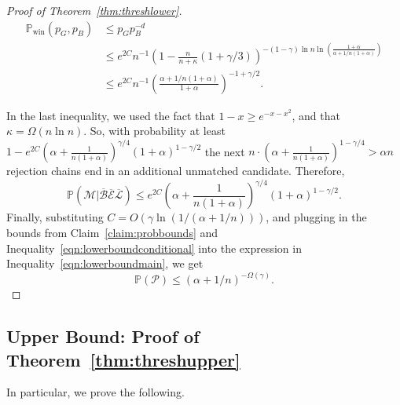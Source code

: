 \documentclass[11pt]{amsart}
\begin{document}
\begin{proof}[Proof of Theorem~\ref{thm:threshlower}]
\begin{align*}
 \mathbb{P}_{\text{win}}\left( p_G, p_B\right) & \leq p_G{p_B^{-d}} \\
 & \leq e^{2C}n^{-1}\left(1 - \frac{n}{n + \kappa}(1+ \gamma/3)\right)^{-(1-\gamma)\ln n\ln\left(\frac{1+ \alpha}{\alpha + 1/n(1 + \alpha)}\right)}\\
 & \leq e^{2C}n^{-1}\left( 
 \frac{\alpha + 1/n(1 + \alpha)}{1+\alpha}\right)^{-1+\gamma/2} .
\end{align*}


In the last inequality, we used the fact that $1-x \geq e^{-x -x^2}$, and that $\kappa = \Omega(n\ln n)$. So, with probability at least 
$1- e^{2C} \left( \alpha + \frac{1}{n(1+\alpha)}\right)^{\gamma/4}(1+\alpha)^{1 - \gamma/2}$
the next $n \cdot \left( \alpha + \frac{1}{n(1+\alpha)}\right)^{1- \gamma/4} >\alpha n$
rejection chains end in an additional unmatched candidate. Therefore,
\begin{equation}\label{eqn:lowerboundconditional}
\mathbb{P}(\mathcal{M} | \overline{\mathcal{B}} \overline{\mathcal{E}}\overline{\mathcal{L}}) \leq e^{2C} \left( \alpha + \frac{1}{n(1+\alpha)}\right)^{\gamma/4}(1+\alpha)^{1 - \gamma/2}.
\end{equation}
Finally, substituting $C = O(\gamma \ln(1/(\alpha + 1/n)))$, and plugging in the bounds from Claim~\ref{claim:probbounds} and Inequality~\eqref{eqn:lowerboundconditional} into the expression in Inequality~\eqref{eqn:lowerboundmain}, we get 
\[
\mathbb{P}(\mathcal{P})\leq (\alpha + 1/n)^{-\Omega(\gamma)}.
\]
\end{proof}


\subsection{Upper Bound: Proof of Theorem~\ref{thm:threshupper}}\label{sec:upper}
In particular, we prove the following.
\end{document}
